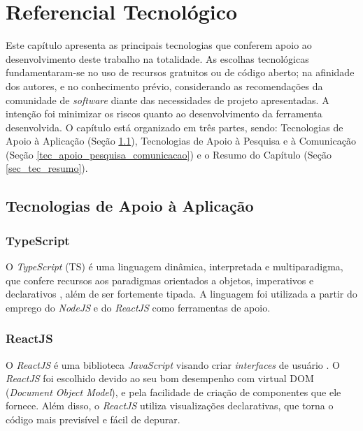 \chapter[Referencial Tecnológico]{Referencial Tecnológico}

\label{chap:referencial_tecnologico}

Este capítulo apresenta as principais tecnologias que conferem apoio ao desenvolvimento deste trabalho na totalidade. As escolhas tecnológicas fundamentaram-se no uso de recursos gratuitos ou de código aberto; na afinidade dos autores, e no conhecimento prévio, considerando as recomendações da comunidade de \textit{software} diante das necessidades de projeto apresentadas. A intenção foi minimizar os riscos quanto ao desenvolvimento da ferramenta desenvolvida. O capítulo está organizado em três partes, sendo: Tecnologias de Apoio à Aplicação (Seção \ref{tec_apoio_app}), Tecnologias de Apoio à Pesquisa e à Comunicação (Seção \ref{tec_apoio_pesquisa_comunicacao}) e o Resumo do Capítulo (Seção \ref{sec_tec_resumo}).


\section{Tecnologias de Apoio à Aplicação}

\label{tec_apoio_app}

\subsection{TypeScript}
O \textit{TypeScript} (TS) é uma linguagem dinâmica, interpretada e multiparadigma, que confere recursos aos paradigmas orientados a objetos, imperativos e declarativos \cite{typescript}, além de ser fortemente tipada. A linguagem foi utilizada a partir do emprego do \textit{NodeJS} e do \textit{ReactJS} como ferramentas de apoio.

\subsection{ReactJS}
O \textit{ReactJS} é uma biblioteca \textit{JavaScript} visando criar \textit{interfaces} de usuário \cite{reactjs}. O \textit{ReactJS} foi escolhido devido ao seu bom desempenho com virtual DOM (\textit{Document Object Model}), e pela facilidade de criação de componentes que ele fornece. Além disso, o \textit{ReactJS} utiliza visualizações declarativas, que torna o código mais previsível e fácil de depurar.

